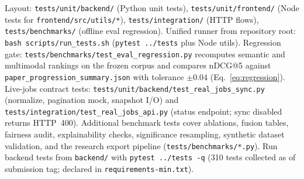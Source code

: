 Layout: \texttt{tests/unit/backend/} (Python unit tests), \texttt{tests/unit/frontend/} (Node tests for \texttt{frontend/src/utils/*}), \texttt{tests/integration/} (HTTP flows), \texttt{tests/benchmarks/} (offline eval regression).
Unified runner from repository root: \texttt{bash scripts/run\_tests.sh} (\texttt{pytest ../tests} plus Node utils).
Regression gate: \texttt{tests/benchmarks/test\_eval\_regression.py} recomputes semantic and multimodal rankings on the frozen corpus and compares nDCG@5 against \texttt{paper\_progression\_summary.json} with tolerance $\pm 0.04$ (Eq.~\ref{eq:regression}).
Live-jobs contract tests: \texttt{tests/unit/backend/test\_real\_jobs\_sync.py} (normalize, pagination mock, snapshot I/O) and \texttt{tests/integration/test\_real\_jobs\_api.py} (status endpoint; sync disabled returns HTTP~400).
Additional benchmark tests cover ablations, fusion tables, fairness audit, explainability checks, significance resampling, synthetic dataset validation, and the research export pipeline (\texttt{tests/benchmarks/*.py}).
Run backend tests from \texttt{backend/} with \texttt{pytest ../tests -q} (310 tests collected as of submission tag; declared in \texttt{requirements-min.txt}).

